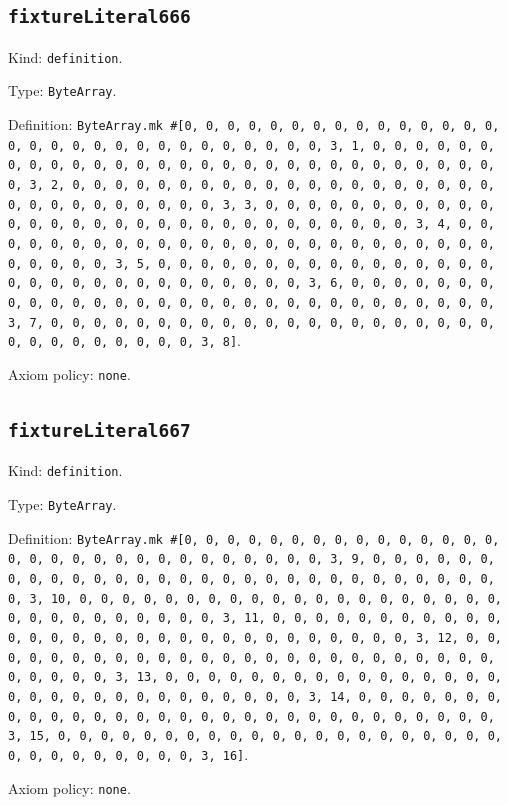 \documentclass[11pt]{article}
\begin{document}
\subsection*{\texttt{fixtureLiteral666}}
\noindent Kind: \texttt{definition}.\par
\noindent Type: \texttt{ByteArray}.\par
\noindent Definition: \texttt{ByteArray.mk \#[0, 0, 0, 0, 0, 0, 0, 0, 0, 0, 0, 0, 0, 0, 0, 0, 0, 0, 0, 0, 0, 0, 0, 0, 0, 0, 0, 0, 0, 0, 3, 1, 0, 0, 0, 0, 0, 0, 0, 0, 0, 0, 0, 0, 0, 0, 0, 0, 0, 0, 0, 0, 0, 0, 0, 0, 0, 0, 0, 0, 0, 0, 3, 2, 0, 0, 0, 0, 0, 0, 0, 0, 0, 0, 0, 0, 0, 0, 0, 0, 0, 0, 0, 0, 0, 0, 0, 0, 0, 0, 0, 0, 0, 0, 3, 3, 0, 0, 0, 0, 0, 0, 0, 0, 0, 0, 0, 0, 0, 0, 0, 0, 0, 0, 0, 0, 0, 0, 0, 0, 0, 0, 0, 0, 0, 0, 3, 4, 0, 0, 0, 0, 0, 0, 0, 0, 0, 0, 0, 0, 0, 0, 0, 0, 0, 0, 0, 0, 0, 0, 0, 0, 0, 0, 0, 0, 0, 0, 3, 5, 0, 0, 0, 0, 0, 0, 0, 0, 0, 0, 0, 0, 0, 0, 0, 0, 0, 0, 0, 0, 0, 0, 0, 0, 0, 0, 0, 0, 0, 0, 3, 6, 0, 0, 0, 0, 0, 0, 0, 0, 0, 0, 0, 0, 0, 0, 0, 0, 0, 0, 0, 0, 0, 0, 0, 0, 0, 0, 0, 0, 0, 0, 3, 7, 0, 0, 0, 0, 0, 0, 0, 0, 0, 0, 0, 0, 0, 0, 0, 0, 0, 0, 0, 0, 0, 0, 0, 0, 0, 0, 0, 0, 0, 0, 3, 8]}.\par
\noindent Axiom policy: \texttt{none}.\par
\subsection*{\texttt{fixtureLiteral667}}
\noindent Kind: \texttt{definition}.\par
\noindent Type: \texttt{ByteArray}.\par
\noindent Definition: \texttt{ByteArray.mk \#[0, 0, 0, 0, 0, 0, 0, 0, 0, 0, 0, 0, 0, 0, 0, 0, 0, 0, 0, 0, 0, 0, 0, 0, 0, 0, 0, 0, 0, 0, 3, 9, 0, 0, 0, 0, 0, 0, 0, 0, 0, 0, 0, 0, 0, 0, 0, 0, 0, 0, 0, 0, 0, 0, 0, 0, 0, 0, 0, 0, 0, 0, 3, 10, 0, 0, 0, 0, 0, 0, 0, 0, 0, 0, 0, 0, 0, 0, 0, 0, 0, 0, 0, 0, 0, 0, 0, 0, 0, 0, 0, 0, 0, 0, 3, 11, 0, 0, 0, 0, 0, 0, 0, 0, 0, 0, 0, 0, 0, 0, 0, 0, 0, 0, 0, 0, 0, 0, 0, 0, 0, 0, 0, 0, 0, 0, 3, 12, 0, 0, 0, 0, 0, 0, 0, 0, 0, 0, 0, 0, 0, 0, 0, 0, 0, 0, 0, 0, 0, 0, 0, 0, 0, 0, 0, 0, 0, 0, 3, 13, 0, 0, 0, 0, 0, 0, 0, 0, 0, 0, 0, 0, 0, 0, 0, 0, 0, 0, 0, 0, 0, 0, 0, 0, 0, 0, 0, 0, 0, 0, 3, 14, 0, 0, 0, 0, 0, 0, 0, 0, 0, 0, 0, 0, 0, 0, 0, 0, 0, 0, 0, 0, 0, 0, 0, 0, 0, 0, 0, 0, 0, 0, 3, 15, 0, 0, 0, 0, 0, 0, 0, 0, 0, 0, 0, 0, 0, 0, 0, 0, 0, 0, 0, 0, 0, 0, 0, 0, 0, 0, 0, 0, 0, 0, 3, 16]}.\par
\noindent Axiom policy: \texttt{none}.\par
\end{document}
